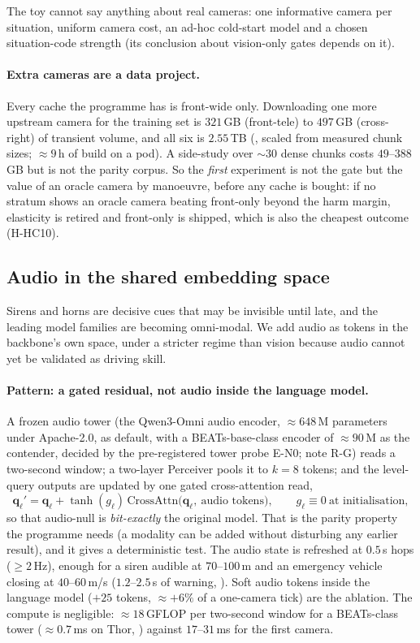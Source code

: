 The toy cannot say anything about real cameras: one informative camera per situation, uniform camera cost, an ad-hoc cold-start model and a chosen situation-code strength (its conclusion about vision-only gates depends on it).

\paragraph{Extra cameras are a data project.}
Every cache the programme has is front-wide only. Downloading one more upstream camera for the training set is $321$\,GB (front-tele) to $497$\,GB (cross-right) of transient volume, and all six is $2.55$\,TB (\evE, scaled from measured chunk sizes; $\approx9$\,h of build on a pod). A side-study over $\sim30$ dense chunks costs $49$--$388$\,GB but is not the parity corpus.
So the \emph{first} experiment is not the gate but the value of an oracle camera by manoeuvre, before any cache is bought: if no stratum shows an oracle camera beating front-only beyond the harm margin, elasticity is retired and front-only is shipped, which is also the cheapest outcome (H-HC10).

\subsection{Audio in the shared embedding space}\label{sec:audio}
Sirens and horns are decisive cues that may be invisible until late, and the leading model families are becoming omni-modal. We add audio as tokens in the backbone's own space, under a stricter regime than vision because audio cannot yet be validated as driving skill.

\paragraph{Pattern: a gated residual, not audio inside the language model.}
A frozen audio tower (the Qwen3-Omni audio encoder, $\approx648$\,M parameters under Apache-2.0, as default, with a BEATs-base-class encoder of $\approx90$\,M as the contender, decided by the pre-registered tower probe E-N0; note R-G) reads a two-second window; a two-layer Perceiver pools it to $k=8$ tokens; and the level-query outputs are updated by one gated cross-attention read,
\begin{equation}
\mathbf q_\ell'=\mathbf q_\ell+\tanh(g_\ell)\,\mathrm{CrossAttn}\big(\mathbf q_\ell,\ \text{audio tokens}\big),\qquad g_\ell\equiv0\ \text{at initialisation},
\end{equation}
so that audio-null is \emph{bit-exactly} the original model. That is the parity property the programme needs (a modality can be added without disturbing any earlier result), and it gives a deterministic test. The audio state is refreshed at $0.5$\,s hops ($\ge2$\,Hz), enough for a siren audible at $70$--$100$\,m and an emergency vehicle closing at $40$--$60$\,m/s ($1.2$--$2.5$\,s of warning, \evE). Soft audio tokens inside the language model ($+25$ tokens, $\approx+6\%$ of a one-camera tick) are the ablation.
The compute is negligible: $\approx18$\,GFLOP per two-second window for a BEATs-class tower ($\approx0.7$\,ms on Thor, \evE) against $17$--$31$\,ms for the first camera.

